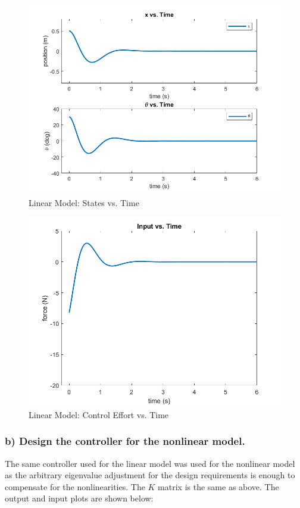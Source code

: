 \documentclass[12pt, letterpaper, onecolumn]{article}
\begin{document}
\begin{figure}[h!]
    \centering
    \includegraphics[width=\linewidth]{figs/p3-a-states.png}
    \caption{Linear Model: States vs. Time}
    \label{}
\end{figure}

\begin{figure}[h!]
    \centering
    \includegraphics[width=\linewidth]{figs/p3-a-input.png}
    \caption{Linear Model: Control Effort vs. Time}
    \label{}
\end{figure}

\clearpage

\subsubsection*{b) Design the controller for the nonlinear model.}
The same controller used for the linear model was used for the nonlinear model as the arbitrary eigenvalue adjustment for the design requirements is enough to compensate for the nonlinearities. The $K$ matrix is the same as above. The output and input plots are shown below:
\end{document}
